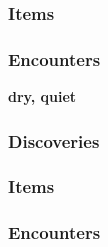 \subsubsection{Items}
\begin{itemize}
\end{itemize}
\subsubsection{Encounters}
\begin{itemize}
\end{itemize}

\textbf{dry, quiet}
\begin{DndReadAloud}
\end{DndReadAloud}
\subsubsection{Discoveries}
\begin{itemize}
\end{itemize}
\subsubsection{Items}
\begin{itemize}
\end{itemize}
\subsubsection{Encounters}
\begin{itemize}
\end{itemize}

\vfill
